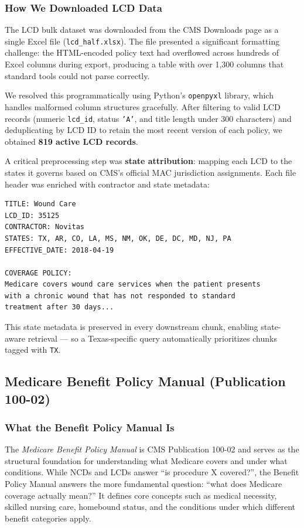 \documentclass[10pt, letterpaper]{article}
\begin{document}
\subsubsection{How We Downloaded LCD Data}
 
The LCD bulk dataset was downloaded from the CMS Downloads page as a single Excel file
(\texttt{lcd\_half.xlsx}). The file presented a significant formatting challenge: the
HTML-encoded policy text had overflowed across hundreds of Excel columns during export,
producing a table with over 1,300 columns that standard tools could not parse correctly.
 
We resolved this programmatically using Python's \texttt{openpyxl} library, which
handles malformed column structures gracefully. After filtering to valid LCD records
(numeric \texttt{lcd\_id}, status \texttt{'A'}, and title length under 300 characters)
and deduplicating by LCD ID to retain the most recent version of each policy, we
obtained \textbf{819 active LCD records}.
 
A critical preprocessing step was \textbf{state attribution}: mapping each LCD to the
states it governs based on CMS's official MAC jurisdiction assignments. Each file header
was enriched with contractor and state metadata:
 
\begin{verbatim}
TITLE: Wound Care
LCD_ID: 35125
CONTRACTOR: Novitas
STATES: TX, AR, CO, LA, MS, NM, OK, DE, DC, MD, NJ, PA
EFFECTIVE_DATE: 2018-04-19
 
COVERAGE POLICY:
Medicare covers wound care services when the patient presents
with a chronic wound that has not responded to standard
treatment after 30 days...
\end{verbatim}
 
This state metadata is preserved in every downstream chunk, enabling state-aware
retrieval --- so a Texas-specific query automatically prioritizes chunks tagged
with \texttt{TX}.
 
\subsection{Medicare Benefit Policy Manual (Publication 100-02)}
 
\subsubsection{What the Benefit Policy Manual Is}
 
The \textit{Medicare Benefit Policy Manual} is CMS Publication 100-02 and serves as
the structural foundation for understanding what Medicare covers and under what
conditions. While NCDs and LCDs answer ``is procedure X covered?'', the Benefit Policy
Manual answers the more fundamental question: ``what does Medicare coverage actually
mean?'' It defines core concepts such as medical necessity, skilled nursing care,
homebound status, and the conditions under which different benefit categories apply.
 
\end{document}

